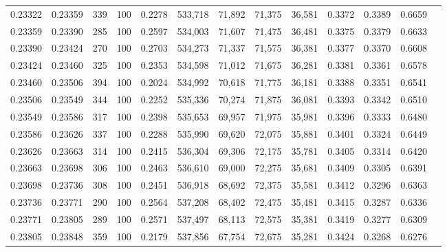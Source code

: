 \begin{tabular}{rrrrrrrrrrrrr}
0.23322 & 0.23359 &   339 & 100 &                                     0.2278 & 533,718 &  71,892 &  71,375 &  36,581 & 0.3372 & 0.3389 & 0.6659 \\
0.23359 & 0.23390 &   285 & 100 &                                     0.2597 & 534,003 &  71,607 &  71,475 &  36,481 & 0.3375 & 0.3379 & 0.6633 \\
0.23390 & 0.23424 &   270 & 100 &                                     0.2703 & 534,273 &  71,337 &  71,575 &  36,381 & 0.3377 & 0.3370 & 0.6608 \\
0.23424 & 0.23460 &   325 & 100 &                                     0.2353 & 534,598 &  71,012 &  71,675 &  36,281 & 0.3381 & 0.3361 & 0.6578 \\
0.23460 & 0.23506 &   394 & 100 &                                     0.2024 & 534,992 &  70,618 &  71,775 &  36,181 & 0.3388 & 0.3351 & 0.6541 \\
0.23506 & 0.23549 &   344 & 100 &                                     0.2252 & 535,336 &  70,274 &  71,875 &  36,081 & 0.3393 & 0.3342 & 0.6510 \\
0.23549 & 0.23586 &   317 & 100 &                                     0.2398 & 535,653 &  69,957 &  71,975 &  35,981 & 0.3396 & 0.3333 & 0.6480 \\
0.23586 & 0.23626 &   337 & 100 &                                     0.2288 & 535,990 &  69,620 &  72,075 &  35,881 & 0.3401 & 0.3324 & 0.6449 \\
0.23626 & 0.23663 &   314 & 100 &                                     0.2415 & 536,304 &  69,306 &  72,175 &  35,781 & 0.3405 & 0.3314 & 0.6420 \\
0.23663 & 0.23698 &   306 & 100 &                                     0.2463 & 536,610 &  69,000 &  72,275 &  35,681 & 0.3409 & 0.3305 & 0.6391 \\
0.23698 & 0.23736 &   308 & 100 &                                     0.2451 & 536,918 &  68,692 &  72,375 &  35,581 & 0.3412 & 0.3296 & 0.6363 \\
0.23736 & 0.23771 &   290 & 100 &                                     0.2564 & 537,208 &  68,402 &  72,475 &  35,481 & 0.3415 & 0.3287 & 0.6336 \\
0.23771 & 0.23805 &   289 & 100 &                                     0.2571 & 537,497 &  68,113 &  72,575 &  35,381 & 0.3419 & 0.3277 & 0.6309 \\
0.23805 & 0.23848 &   359 & 100 &                                     0.2179 & 537,856 &  67,754 &  72,675 &  35,281 & 0.3424 & 0.3268 & 0.6276 \\

\end{tabular}
